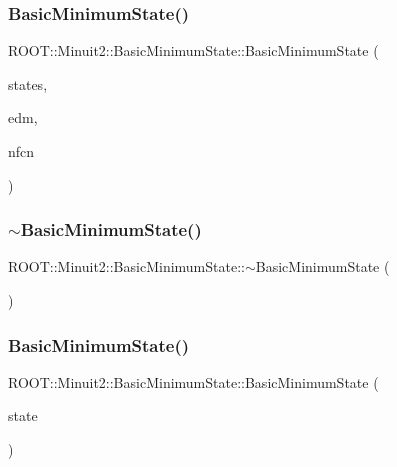 \subsubsection{\texorpdfstring{BasicMinimumState()}{BasicMinimumState()}\hspace{0.1cm}{\footnotesize\ttfamily [7/8]}}
{\footnotesize\ttfamily R\+O\+O\+T\+::\+Minuit2\+::\+Basic\+Minimum\+State\+::\+Basic\+Minimum\+State (\begin{DoxyParamCaption}\item[{const \mbox{\hyperlink{classROOT_1_1Minuit2_1_1MinimumParameters}{Minimum\+Parameters}} \&}]{states,  }\item[{double}]{edm,  }\item[{int}]{nfcn }\end{DoxyParamCaption})\hspace{0.3cm}{\ttfamily [inline]}}

\mbox{\label{classROOT_1_1Minuit2_1_1BasicMinimumState_ae9724fa5e9d8a2f5403ac0a131bfbe91}} 
\subsubsection{\texorpdfstring{$\sim$BasicMinimumState()}{~BasicMinimumState()}\hspace{0.1cm}{\footnotesize\ttfamily [2/2]}}
{\footnotesize\ttfamily R\+O\+O\+T\+::\+Minuit2\+::\+Basic\+Minimum\+State\+::$\sim$\+Basic\+Minimum\+State (\begin{DoxyParamCaption}{ }\end{DoxyParamCaption})\hspace{0.3cm}{\ttfamily [inline]}}

\mbox{\label{classROOT_1_1Minuit2_1_1BasicMinimumState_af76fc4a4cc111099fd188e145fa82b5c}} 
\subsubsection{\texorpdfstring{BasicMinimumState()}{BasicMinimumState()}\hspace{0.1cm}{\footnotesize\ttfamily [8/8]}}
{\footnotesize\ttfamily R\+O\+O\+T\+::\+Minuit2\+::\+Basic\+Minimum\+State\+::\+Basic\+Minimum\+State (\begin{DoxyParamCaption}\item[{const \mbox{\hyperlink{classROOT_1_1Minuit2_1_1BasicMinimumState}{Basic\+Minimum\+State}} \&}]{state }\end{DoxyParamCaption})\hspace{0.3cm}{\ttfamily [inline]}}



